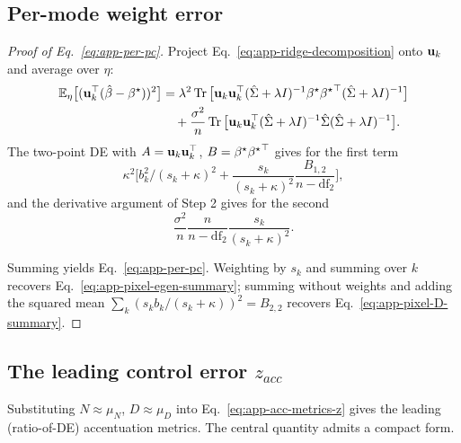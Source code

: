 \subsection{Per-mode weight error}
\begin{proof}[Proof of Eq.~\ref{eq:app-per-pc}]
Project Eq.~\ref{eq:app-ridge-decomposition} onto ${\mathbf{u}}_k$ and average
over $\eta$:
\[
\begin{aligned}
\mathbb{E}_\eta\big[({\mathbf{u}}_k^\top(\hat{\beta}-{\beta^{\star}}))^2\big]
&=\lambda^2\operatorname{Tr}\big[{\mathbf{u}}_k{\mathbf{u}}_k^\top(\hat\Sigma+\lambda I)^{-1}{\beta^{\star}}{{\beta^{\star}}}^\top(\hat\Sigma+\lambda I)^{-1}\big]\\
&\quad+\frac{\sigma^2}{n}\operatorname{Tr}\big[{\mathbf{u}}_k{\mathbf{u}}_k^\top(\hat\Sigma+\lambda I)^{-1}\hat\Sigma(\hat\Sigma+\lambda I)^{-1}\big].
\end{aligned}
\]
The two-point DE with $A={\mathbf{u}}_k{\mathbf{u}}_k^\top$, $B={\beta^{\star}}{{\beta^{\star}}}^\top$ gives
for the first term
\[
\kappa^2\big[b_k^2/(s_k+\kappa)^2+\frac{s_k}{(s_k+\kappa)^2}\frac{B_{1,2}}{n-\mathrm{df}_2}\big],
\]
and the derivative argument of Step 2 gives for the second
\[
\frac{\sigma^2}{n}\frac{n}{n-\mathrm{df}_2}\frac{s_k}{(s_k+\kappa)^2}.
\]

Summing yields Eq.~\ref{eq:app-per-pc}.  Weighting by $s_k$ and summing
over $k$ recovers Eq.~\ref{eq:app-pixel-egen-summary}; summing without
weights and adding the squared mean $\sum_k(s_kb_k/(s_k+\kappa))^2=B_{2,2}$
recovers Eq.~\ref{eq:app-pixel-D-summary}.
\end{proof}

\subsection{The leading control error $z_{acc}$}

Substituting $N\approx\mu_N$, $D\approx\mu_D$ into Eq.~\ref{eq:app-acc-metrics-z}
gives the leading (ratio-of-DE) accentuation metrics.  The central quantity
admits a compact form.

